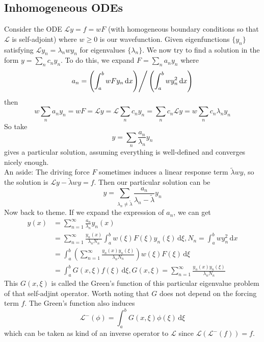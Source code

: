 \subsection{Inhomogeneous ODEs}
Consider the ODE $\mathcal Ly=f=wF$ (with homogeneous boundary conditions so that $\mathcal L$ is self-adjoint) where $w\ge 0$ is our wavefunction.
Given eigenfunctions $\{y_n\}$ satisfying $\mathcal Ly_n=\lambda_nwy_n$ for eigenvalues $\{\lambda_n\}$.
We now try to find a solution in the form $y=\sum_nc_ny_n$.
To do this, we expand $F=\sum_na_ny_n$ where
$$a_n=\left( \int_a^bwFy_n\,\mathrm dx\middle) \right/\left( \int_a^bwy_n^2\,\mathrm dx \right)$$
then
$$w\sum_na_ny_n=wF=\mathcal Ly=\mathcal L\sum_nc_ny_n=\sum_nc_n\mathcal Ly=w\sum_nc_n\lambda_ny_n$$
So take
$$y=\sum_n\frac{a_n}{\lambda_n}y_n$$
gives a particular solution, assuming everything is well-defined and converges nicely enough.\\
An aside:
The driving force $F$ sometimes induces a linear response term $\tilde\lambda wy$, so the solution is $\mathcal Ly-\tilde{\lambda}wy=f$.
Then our particular solution can be
$$y=\sum_{\lambda_n\neq\tilde{\lambda}}\frac{a_n}{\lambda_n-\tilde\lambda}y_n$$
Now back to theme.
If we expand the expression of $a_n$, we can get
\begin{align*}
    y(x)&=\sum_{n=1}^\infty\frac{a_n}{\lambda_n}y_n(x)\\
    &=\sum_{n=1}^\infty\frac{y_n(x)}{\lambda_nN_n}\int_a^bw(\xi)F(\xi)y_n(\xi)\,\mathrm d\xi,N_n=\int_a^bwy_n^2\,\mathrm dx\\
    &=\int_a^b\left( \sum_{n=1}^\infty\frac{y_n(x)y_n(\xi)}{\lambda_nN_n} \right)w(\xi)F(\xi)\,\mathrm d\xi\\
    &=\int_a^bG(x,\xi)f(\xi)\,\mathrm d\xi,G(x,\xi)=\sum_{n=1}^\infty\frac{y_n(x)y_n(\xi)}{\lambda_nN_n}
\end{align*}
This $G(x,\xi)$ is called the Green's function of this particular eigenvalue problem of that self-adjint operator.
Worth noting that $G$ does not depend on the forcing term $f$.
The Green's function also induces
$$\mathcal L^-(\phi)=\int_a^bG(x,\xi)\phi(\xi)\,\mathrm d\xi$$
which can be taken as kind of an inverse operator to $\mathcal L$ since $\mathcal L(\mathcal L^-(f))=f$.
